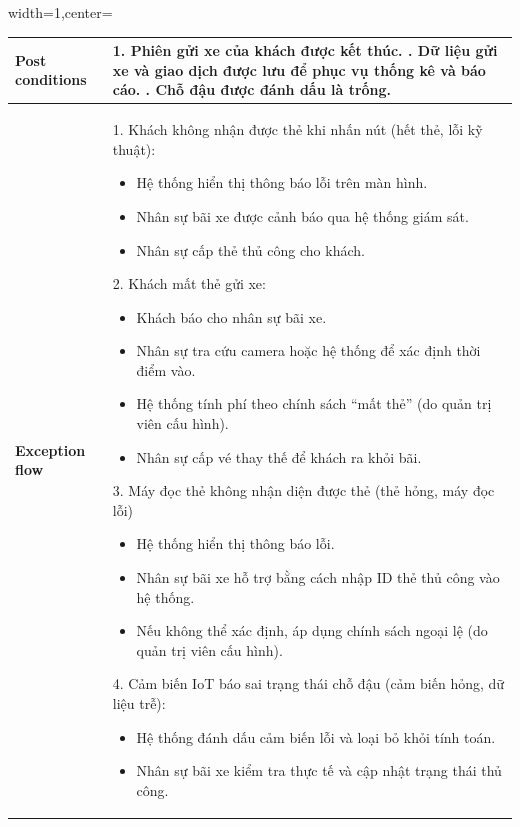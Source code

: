 \begin{adjustbox}{width=1\textwidth,center=\textwidth}
\small
\begin{tabular}{|>{\centering\arraybackslash}m{3.5cm}|m{13.2cm}|}
\hline
\textbf{Post conditions} & 
1. Phiên gửi xe của khách được kết thúc. \newline
2. Dữ liệu gửi xe và giao dịch được lưu để phục vụ thống kê và báo cáo. \newline
3. Chỗ đậu được đánh dấu là trống. \\ \hline
\textbf{Exception flow} & 
1. Khách không nhận được thẻ khi nhấn nút (hết thẻ, lỗi kỹ thuật): 
\begin{itemize}
    \item Hệ thống hiển thị thông báo lỗi trên màn hình.
    \item Nhân sự bãi xe được cảnh báo qua hệ thống giám sát.
    \item Nhân sự cấp thẻ thủ công cho khách.
\end{itemize}
2. Khách mất thẻ gửi xe: 
\begin{itemize}
    \item Khách báo cho nhân sự bãi xe.
    \item Nhân sự tra cứu camera hoặc hệ thống để xác định thời điểm vào.
    \item Hệ thống tính phí theo chính sách “mất thẻ” (do quản trị viên cấu hình).
    \item Nhân sự cấp vé thay thế để khách ra khỏi bãi.
\end{itemize}
3. Máy đọc thẻ không nhận diện được thẻ (thẻ hỏng, máy đọc lỗi)
\begin{itemize}
    \item Hệ thống hiển thị thông báo lỗi.
    \item Nhân sự bãi xe hỗ trợ bằng cách nhập ID thẻ thủ công vào hệ thống.
    \item Nếu không thể xác định, áp dụng chính sách ngoại lệ (do quản trị viên cấu hình).
\end{itemize}
4. Cảm biến IoT báo sai trạng thái chỗ đậu (cảm biến hỏng, dữ liệu trễ):
\begin{itemize}
    \item Hệ thống đánh dấu cảm biến lỗi và loại bỏ khỏi tính toán.
    \item Nhân sự bãi xe kiểm tra thực tế và cập nhật trạng thái thủ công.
\end{itemize}
\\ \hline
\end{tabular}
\end{adjustbox}